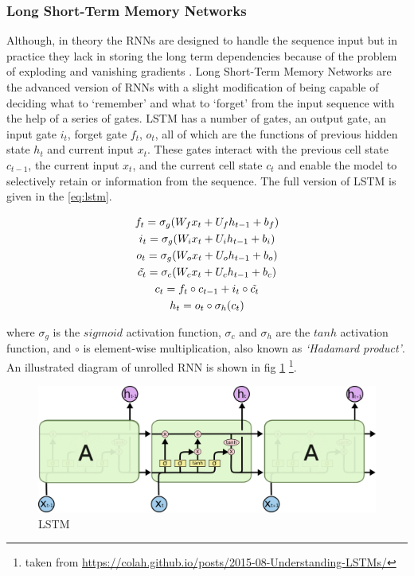 \subsubsection{Long Short-Term Memory Networks}
Although, in theory the RNNs are designed to handle the sequence input but in practice they lack in storing the long term dependencies because of the problem of exploding and vanishing gradients \cite{bengio1994learning}. Long Short-Term Memory Networks \cite{hochreiter1997long} are the advanced version of RNNs with a slight modification of being capable of deciding what to `remember' and what to `forget' from the input sequence with the help of a series of gates. LSTM has a number of gates, an output gate, an input gate $i_{t}$, forget gate $f_{t}$, $o_{t}$, all of which are the functions of previous hidden state $h_{t}$ and current input $x_{t}$. These gates interact with the previous cell state $c_{t-1}$, the current input $x_{t}$, and the current cell state $c_{t}$ and enable the model to selectively retain or information from the sequence. The full version of LSTM is given in the \cref{eq:lstm}.

\begin{equation}\label{eq:lstm}
    \begin{gathered}    
        f_{t} = \sigma_{g} (W_{f}x_{t} + U_{f}h_{t-1} + b_{f}) \\
        i_{t} = \sigma_{g} (W_{i}x_{t} + U_{i}h_{t-1} + b_{i}) \\
        o_{t} = \sigma_{g} (W_{o}x_{t} + U_{o}h_{t-1} + b_{o}) \\
        \Tilde{c_{t}} = \sigma_{c} (W_{c}x_{t} + U_{c}h_{t-1} + b_c)\\
        c_{t} = f_{t} \circ c_{t-1} + i_{t} \circ \Tilde{c_{t}}\\
        h_{t} = o_{t} \circ \sigma_{h}(c_{t})
    \end{gathered}
\end{equation}

where $\sigma_{g}$ is the $sigmoid$ activation function, $\sigma_{c}$ and $\sigma_{h}$ are the $tanh$ activation function, and $\circ$ is element-wise multiplication, also known as \textit{`Hadamard product'}. An illustrated diagram of unrolled RNN is shown in fig \cref{fig:lstm} \footnote{taken from \url{https://colah.github.io/posts/2015-08-Understanding-LSTMs/}}.

\begin{figure}
    \centering
    \includegraphics[width=\textwidth]{images/lstm.png}
    \caption{LSTM}
    \label{fig:lstm}
\end{figure}


